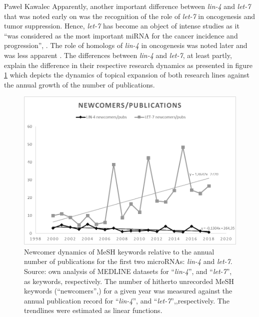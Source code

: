 \begin{artengenv}{Paweł Kawalec}
Apparently, another important difference between \textit{lin-4} and \textit{let-7} that was noted early on was the recognition of the role of \textit{let-7} in oncogenesis and tumor suppression. Hence, \textit{let-7} has become an object of intense studies as it ``was considered as the most important miRNA for the cancer incidence and progression'',
\parencite[][]{wang_comprehensive_2018}. %
 The role of homologs of \textit{lin-4} in oncogenesis was noted later and was less apparent 
\parencite[][]{sonoki_insertion_2005}. %
 The differences between \textit{lin-4} and \textit{let-7}, at least partly, explain the difference in their respective research dynamics as presented in figure \ref{fig3kawalec} which depicts the dynamics of topical expansion of both research lines against the annual growth of the number of publications.
\begin{figure}[h!]
	\includegraphics[width=1\textwidth]{ART_Kawalec/Kawalec-img004bw.png}
	\caption{Newcomer dynamics of MeSH keywords relative to the annual number of publications for the first two microRNAs: \textit{lin-4} and \textit{let-7}. Source: own analysis of MEDLINE datasets for ``\textit{lin-4}'', and ``\textit{let-7}'', as keywords, respectively. The number of hitherto unrecorded MeSH keywords (``newcomers'',) for a given year was measured against the annual publication record for ``\textit{lin-4}'', and ``\textit{let-7}'',,respectively. The trendlines were estimated as linear functions.}\label{fig3kawalec}
\end{figure}


\end{artengenv}
